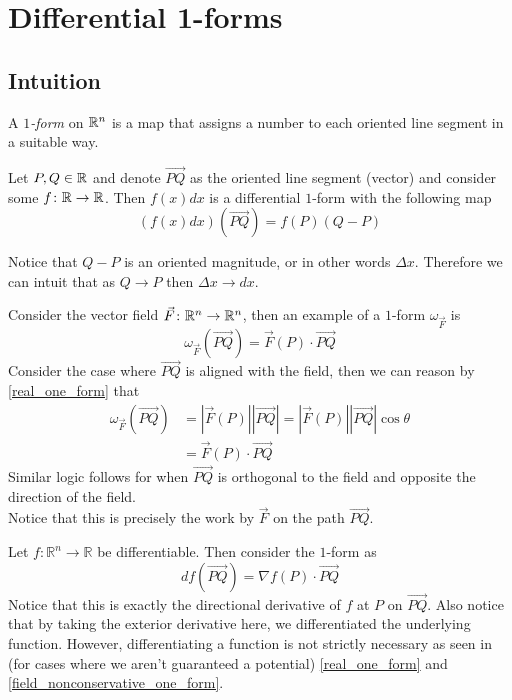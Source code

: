 \documentclass[notes]{subfiles}
\begin{document}
\setcounter{section}{1}
\section{Differential 1-forms}

\subsection{Intuition}
\begin{definition}
    A \textit{$1$-form} on $\mathbb{R}^n$ is a map that assigns a number to each oriented line segment in a suitable way.
\end{definition}

\begin{example} \label{real_one_form}
    Let $P, Q \in \mathbb{R}$ and denote $\vec{PQ}$ as the oriented line segment (vector) and consider some $f\colon \mathbb{R} \to \mathbb{R}$. Then $f(x)dx$ is a differential $1$-form with the following map
    \[
        \left(f(x)dx\right)(\vec{PQ}) = f(P)(Q - P)
    \]
\end{example}
Notice that $Q - P$ is an oriented magnitude, or in other words $\Delta x$. Therefore we can intuit that as $Q \to P$ then $\Delta x \to dx$.

\begin{example} \label{field_nonconservative_one_form}
    Consider the vector field $\vec{F}\colon \mathbb{R}^n \to \mathbb{R}^n$, then an example of a $1$-form $\omega_{\vec{F}}$ is
    \[
        \omega_{\vec{F}}(\vec{PQ}) = \vec{F}(P)\cdot\vec{PQ}
    \]
    Consider the case where $\vec{PQ}$ is aligned with the field, then we can reason by \cref{real_one_form} that
    \begin{align*}
        \omega_{\vec{F}}(\vec{PQ})
        &= |\vec{F}(P)||\vec{PQ}|
        = |\vec{F}(P)||\vec{PQ}|\cos\theta \\
        &= \vec{F}(P)\cdot\vec{PQ}
    \end{align*}
    Similar logic follows for when $\vec{PQ}$ is orthogonal to the field and opposite the direction of the field. \\
    Notice that this is precisely the work by $\vec{F}$ on the path $\vec{PQ}$.
\end{example}

\begin{example} \label{field_conservative_one_form}
    Let $f\colon \mathbb{R}^n \to \mathbb{R}$ be differentiable. Then consider the $1$-form as
    \[
        df(\vec{PQ}) = \nabla f(P)\cdot\vec{PQ}
    \]
    Notice that this is exactly the directional derivative of $f$ at $P$ on $\vec{PQ}$. Also notice that by taking the exterior derivative here, we differentiated the underlying function. However, differentiating a function is not strictly necessary as seen in (for cases where we aren't guaranteed a potential) \cref{real_one_form} and \cref{field_nonconservative_one_form}.
\end{example}
\end{document}
